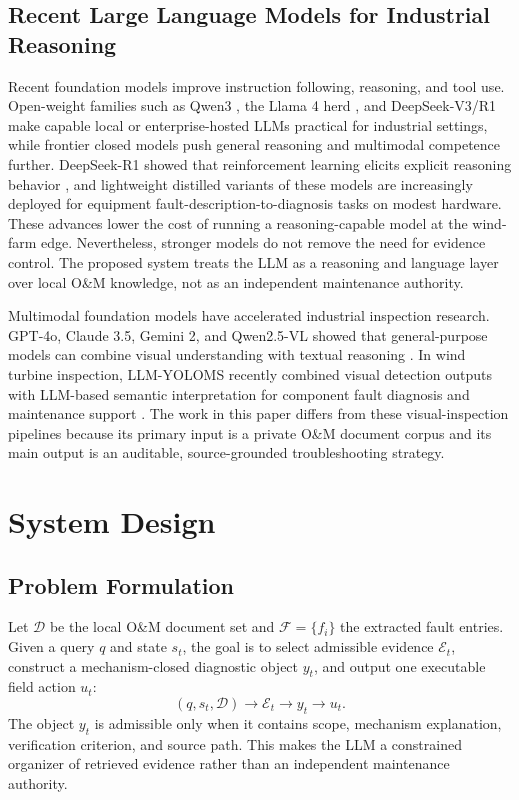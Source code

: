 \documentclass[lettersize,journal]{IEEEtran}
\begin{document}
\subsection{Recent Large Language Models for Industrial Reasoning}
Recent foundation models improve instruction following, reasoning, and tool use. Open-weight families such as Qwen3 \cite{qwen2025qwen3}, the Llama 4 herd \cite{grattafiori2025llama4}, and DeepSeek-V3/R1 \cite{deepseek2024v3,deepseek2025r1} make capable local or enterprise-hosted LLMs practical for industrial settings, while frontier closed models push general reasoning and multimodal competence further. DeepSeek-R1 showed that reinforcement learning elicits explicit reasoning behavior \cite{deepseek2025r1}, and lightweight distilled variants of these models are increasingly deployed for equipment fault-description-to-diagnosis tasks on modest hardware. These advances lower the cost of running a reasoning-capable model at the wind-farm edge. Nevertheless, stronger models do not remove the need for evidence control. The proposed system treats the LLM as a reasoning and language layer over local O\&M knowledge, not as an independent maintenance authority.

Multimodal foundation models have accelerated industrial inspection research. GPT-4o, Claude 3.5, Gemini 2, and Qwen2.5-VL showed that general-purpose models can combine visual understanding with textual reasoning \cite{openai2023gpt4v,anthropic2024claude,google2023gemini,qwen2025vl25}. In wind turbine inspection, LLM-YOLOMS recently combined visual detection outputs with LLM-based semantic interpretation for component fault diagnosis and maintenance support \cite{li2025llmyoloms}. The work in this paper differs from these visual-inspection pipelines because its primary input is a private O\&M document corpus and its main output is an auditable, source-grounded troubleshooting strategy.

\section{System Design}
\subsection{Problem Formulation}
Let $\mathcal{D}$ be the local O\&M document set and $\mathcal{F}=\{f_i\}$ the extracted fault entries. Given a query $q$ and state $s_t$, the goal is to select admissible evidence $\mathcal{E}_t$, construct a mechanism-closed diagnostic object $y_t$, and output one executable field action $u_t$:
\begin{equation}
(q,s_t,\mathcal{D}) \rightarrow \mathcal{E}_t \rightarrow y_t \rightarrow u_t .
\end{equation}
The object $y_t$ is admissible only when it contains scope, mechanism explanation, verification criterion, and source path. This makes the LLM a constrained organizer of retrieved evidence rather than an independent maintenance authority.
\end{document}
